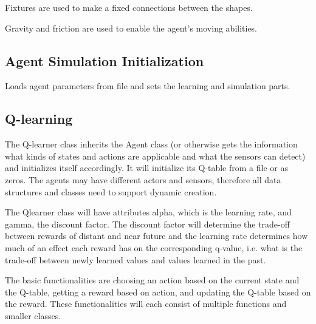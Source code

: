 \documentclass{article}
\begin{document}
Fixtures are used to make a fixed connections between the shapes.

Gravity and friction are used to enable the agent's moving abilities.


\subsection{Agent Simulation Initialization}
Loads agent parameters from file and sets the learning and simulation parts.


\subsection{Q-learning}
The Q-learner class inherits the Agent class (or otherwise gets the information
what kinds of states and actions are applicable and what the sensors can detect)
and initializes itself accordingly. It will initialize its Q-table from a file
or as zeros. The agents may have different actors and sensors,
therefore all data structures and classes
need to support dynamic creation.

The Qlearner class will have attributes alpha, which is the learning rate,
and gamma, the discount factor. The discount factor will determine the trade-off
between rewards of distant and near future and the learning rate determines how
much of an effect each reward has on the corresponding q-value, i.e. what is the
trade-off between newly learned values and values learned in the past.

The basic functionalities are choosing an action based on the current state and
the Q-table, getting a reward based on
action, and updating the Q-table based on
the reward. These functionalities will each consist of multiple functions and
smaller classes.
\end{document}
